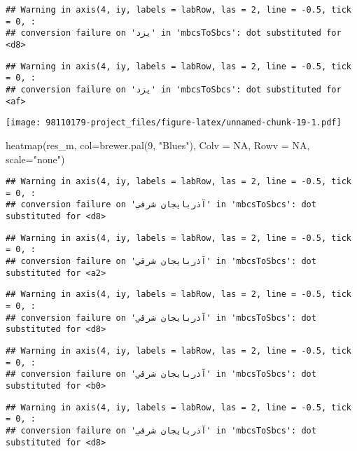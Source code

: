 \documentclass[
]{article}
\newenvironment{Shaded}{\begin{snugshade}}{\end{snugshade}}
\newcommand{\AttributeTok}[1]{\textcolor[rgb]{0.77,0.63,0.00}{#1}}
\newcommand{\ConstantTok}[1]{\textcolor[rgb]{0.00,0.00,0.00}{#1}}
\newcommand{\DecValTok}[1]{\textcolor[rgb]{0.00,0.00,0.81}{#1}}
\newcommand{\FunctionTok}[1]{\textcolor[rgb]{0.00,0.00,0.00}{#1}}
\newcommand{\NormalTok}[1]{#1}
\newcommand{\StringTok}[1]{\textcolor[rgb]{0.31,0.60,0.02}{#1}}
\begin{document}
\begin{verbatim}
## Warning in axis(4, iy, labels = labRow, las = 2, line = -0.5, tick = 0, :
## conversion failure on 'یزد' in 'mbcsToSbcs': dot substituted for <d8>
\end{verbatim}

\begin{verbatim}
## Warning in axis(4, iy, labels = labRow, las = 2, line = -0.5, tick = 0, :
## conversion failure on 'یزد' in 'mbcsToSbcs': dot substituted for <af>
\end{verbatim}

\texttt{[image: 98110179-project\_files/figure-latex/unnamed-chunk-19-1.pdf]}

\begin{Shaded}
\begin{Highlighting}[]
\FunctionTok{heatmap}\NormalTok{(res\_m, }\AttributeTok{col=}\FunctionTok{brewer.pal}\NormalTok{(}\DecValTok{9}\NormalTok{, }\StringTok{"Blues"}\NormalTok{), }\AttributeTok{Colv =} \ConstantTok{NA}\NormalTok{, }\AttributeTok{Rowv =} \ConstantTok{NA}\NormalTok{, }\AttributeTok{scale=}\StringTok{"none"}\NormalTok{)}
\end{Highlighting}
\end{Shaded}

\begin{verbatim}
## Warning in axis(4, iy, labels = labRow, las = 2, line = -0.5, tick = 0, :
## conversion failure on 'آذربايجان شرقي' in 'mbcsToSbcs': dot substituted for <d8>
\end{verbatim}

\begin{verbatim}
## Warning in axis(4, iy, labels = labRow, las = 2, line = -0.5, tick = 0, :
## conversion failure on 'آذربايجان شرقي' in 'mbcsToSbcs': dot substituted for <a2>
\end{verbatim}

\begin{verbatim}
## Warning in axis(4, iy, labels = labRow, las = 2, line = -0.5, tick = 0, :
## conversion failure on 'آذربايجان شرقي' in 'mbcsToSbcs': dot substituted for <d8>
\end{verbatim}

\begin{verbatim}
## Warning in axis(4, iy, labels = labRow, las = 2, line = -0.5, tick = 0, :
## conversion failure on 'آذربايجان شرقي' in 'mbcsToSbcs': dot substituted for <b0>
\end{verbatim}

\begin{verbatim}
## Warning in axis(4, iy, labels = labRow, las = 2, line = -0.5, tick = 0, :
## conversion failure on 'آذربايجان شرقي' in 'mbcsToSbcs': dot substituted for <d8>
\end{verbatim}
\end{document}
